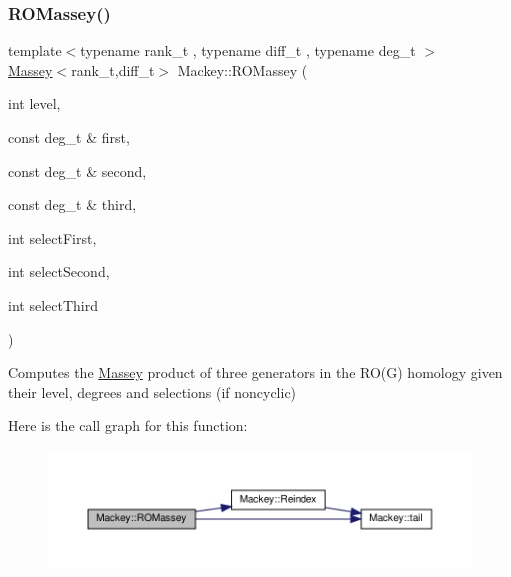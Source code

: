\subsubsection{\texorpdfstring{R\+O\+Massey()}{ROMassey()}\hspace{0.1cm}{\footnotesize\ttfamily [1/2]}}
{\footnotesize\ttfamily template$<$typename rank\+\_\+t , typename diff\+\_\+t , typename deg\+\_\+t $>$ \\
\hyperlink{classMackey_1_1Massey}{Massey}$<$rank\+\_\+t,diff\+\_\+t$>$ Mackey\+::\+R\+O\+Massey (\begin{DoxyParamCaption}\item[{int}]{level,  }\item[{const deg\+\_\+t \&}]{first,  }\item[{const deg\+\_\+t \&}]{second,  }\item[{const deg\+\_\+t \&}]{third,  }\item[{int}]{select\+First,  }\item[{int}]{select\+Second,  }\item[{int}]{select\+Third }\end{DoxyParamCaption})}



Computes the \hyperlink{classMackey_1_1Massey}{Massey} product of three generators in the R\+O(\+G) homology given their level, degrees and selections (if noncyclic) 

Here is the call graph for this function\+:\nopagebreak
\begin{figure}[H]
\begin{center}
\leavevmode
\includegraphics[width=350pt]{namespaceMackey_aa98cd58919c2f716d8df7d61ef1f5c07_cgraph}
\end{center}
\end{figure}
\mbox{\label{namespaceMackey_a7301f53f372c1dc670b4c10f878137a2}} 
